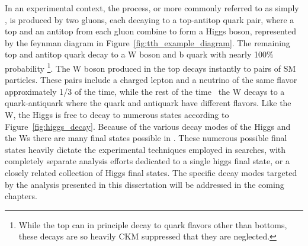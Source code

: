 In an experimental context, the \tth process, or more commonly referred to as simply \tth, is produced by two gluons, each decaying to a top-antitop quark pair, where a top and an
antitop from each gluon combine to form a Higgs boson, represented by the feynman diagram in Figure~\ref{fig:tth_example_diagram}.
The remaining top and antitop quark decay to a W boson and b quark with nearly 100$\%$ probability
\footnote{While the top can in principle decay to quark flavors other than bottoms, these decays are so heavily CKM suppressed\cite{CKM} that they are
neglected.}. The W boson produced in the top decays instantly to pairs of SM particles. These pairs include a charged lepton and a neutrino of the same
flavor approximately 1/3 of the time, while the rest of the time~\cite{pdg} the W decays to a quark-antiquark where the quark and antiquark have different flavors. 
Like the W, the Higgs is free to decay to numerous states according to Figure~\ref{fig:higgs_decay}. Because of the various decay modes of the Higgs and
the Ws there are many final states possible in \tth. These numerous possible final states heavily dictate the experimental techniques employed in searches,
with completely separate analysis efforts dedicated to a single \tth higgs final state, or a closely related collection of Higgs final states. The specific
decay modes targeted by the analysis presented in this dissertation will be addressed in the coming chapters. 


%
% 
% 
